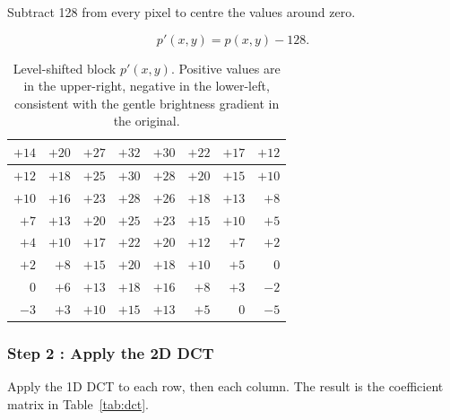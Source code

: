 Subtract 128 from every pixel to centre the values around zero.

\begin{equation}
  p'(x,y) = p(x,y) - 128.
\end{equation}

\begin{table}[H]
\centering
\caption{Level-shifted block $p'(x,y)$. Positive values are in the upper-right, negative in the lower-left, consistent with the gentle brightness gradient in the original.}
\label{tab:levelshift}
\setlength{\tabcolsep}{5pt}
\begin{tabular}{|r|r|r|r|r|r|r|r|}
\hline
\rowcolor{LightBlue!40}
$+14$ & $+20$ & $+27$ & $+32$ & $+30$ & $+22$ & $+17$ & $+12$ \\
\hline
$+12$ & $+18$ & $+25$ & $+30$ & $+28$ & $+20$ & $+15$ & $+10$ \\
\hline
\rowcolor{LightGray!10}
$+10$ & $+16$ & $+23$ & $+28$ & $+26$ & $+18$ & $+13$ & $+8$  \\
\hline
$+7$  & $+13$ & $+20$ & $+25$ & $+23$ & $+15$ & $+10$ & $+5$  \\
\hline
\rowcolor{LightGray!10}
$+4$  & $+10$ & $+17$ & $+22$ & $+20$ & $+12$ & $+7$  & $+2$  \\
\hline
$+2$  & $+8$  & $+15$ & $+20$ & $+18$ & $+10$ & $+5$  & $0$   \\
\hline
\rowcolor{LightGray!10}
$0$   & $+6$  & $+13$ & $+18$ & $+16$ & $+8$  & $+3$  & $-2$  \\
\hline
$-3$  & $+3$  & $+10$ & $+15$ & $+13$ & $+5$  & $0$   & $-5$  \\
\hline
\end{tabular}
\end{table}

\subsubsection{Step 2 : Apply the 2D DCT}

Apply the 1D DCT to each row, then each column. The result is the coefficient matrix in Table~\ref{tab:dct}.

